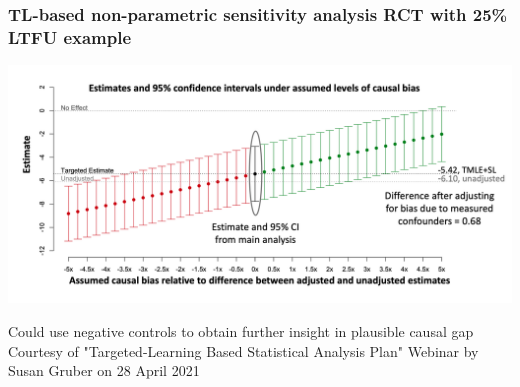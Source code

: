 \documentclass[t]{beamer}
\begin{document}
\begin{frame}
\frametitle{TL-based non-parametric sensitivity analysis
RCT with 25\% LTFU example}
\vspace{-10pt}
  \begin{center}
  \includegraphics[width = 1.05\textwidth]{figures/gruber_sensitivity.png}
  \end{center}
   \small{Could use negative controls to obtain further insight in plausible causal gap}\ \newline\newline\newline\newline 
  \vspace{35pt}
\tiny{Courtesy of "Targeted-Learning Based Statistical Analysis Plan" Webinar by Susan Gruber on 28 April 2021}
\end{frame}

\end{document}
